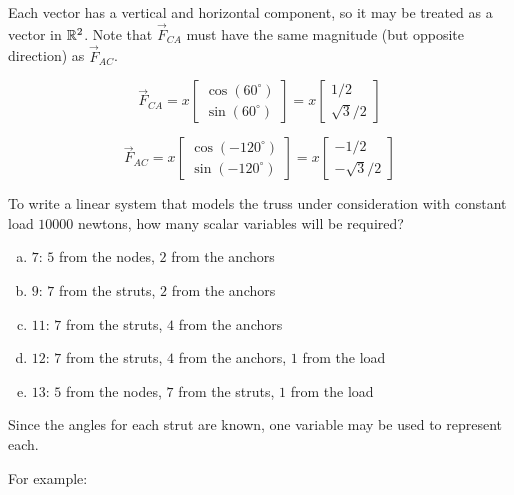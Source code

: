 \begin{applicationActivities}
\begin{observation}
\drawtruss{}

Each vector has a vertical and horizontal component,
so it may be treated as a vector in \(\mathbb{R}^2\).
Note that \(\vec F_{CA}\) must have the same magnitude (but opposite
direction) as \(\vec F_{AC}\).

\[
  \vec{F}_{CA}
    = 
  x\begin{bmatrix} \cos(60^\circ) \\ \sin(60^\circ) \end{bmatrix}
    =
  x\begin{bmatrix} 1/2 \\ \sqrt{3}/2\end{bmatrix}
\]

\[
  \vec{F}_{AC}
    = 
  x\begin{bmatrix} \cos(-120^\circ) \\ \sin(-120^\circ) \end{bmatrix}
    =
  x\begin{bmatrix} -1/2 \\ -\sqrt{3}/2\end{bmatrix}
\]
\end{observation}

\begin{activity}{5}
To write a linear system that models the truss under consideration
with constant load \(10000\) newtons,
how many scalar variables will be required?

\drawtruss{}

\begin{enumerate}[a)]
\item \(7\): \(5\) from the nodes, \(2\) from the anchors
\item \(9\): \(7\) from the struts, \(2\) from the anchors
\item \(11\): \(7\) from the struts, \(4\) from the anchors
\item \(12\): \(7\) from the struts, \(4\) from the anchors, \(1\) from the load
\item \(13\): \(5\) from the nodes, \(7\) from the struts, \(1\) from the load
\end{enumerate}
\end{activity}

\begin{observation}
Since the angles for each strut are known,
one variable may be used to represent each.

\drawtruss{\trussStrutVariables}

For example:


\end{observation}
\end{applicationActivities}
